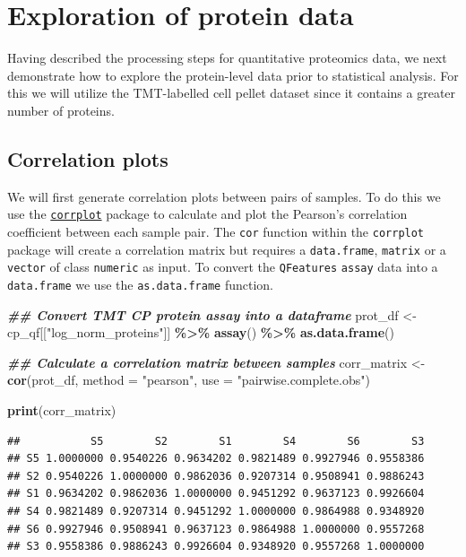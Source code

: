 \documentclass[9pt,a4paper,]{extarticle}
\newenvironment{Shaded}{\begin{snugshade}}{\end{snugshade}}
\newcommand{\AttributeTok}[1]{\textcolor[rgb]{0.13,0.29,0.53}{#1}}
\newcommand{\DocumentationTok}[1]{\textcolor[rgb]{0.56,0.35,0.01}{\textbf{\textit{#1}}}}
\newcommand{\FunctionTok}[1]{\textcolor[rgb]{0.13,0.29,0.53}{\textbf{#1}}}
\newcommand{\NormalTok}[1]{#1}
\newcommand{\OtherTok}[1]{\textcolor[rgb]{0.56,0.35,0.01}{#1}}
\newcommand{\SpecialCharTok}[1]{\textcolor[rgb]{0.81,0.36,0.00}{\textbf{#1}}}
\newcommand{\StringTok}[1]{\textcolor[rgb]{0.31,0.60,0.02}{#1}}
\begin{document}
\section{Exploration of protein data}\label{exploration-of-protein-data}

Having described the processing steps for quantitative proteomics data, we next
demonstrate how to explore the protein-level data prior to statistical analysis.
For this we will utilize the TMT-labelled cell pellet dataset since it contains
a greater number of proteins.

\subsection{Correlation plots}\label{correlation-plots}

We will first generate correlation plots between pairs of samples. To do this we
use the \href{https://cran.r-project.org/web/packages/corrplot/vignettes/corrplot-intro.html}{\texttt{corrplot}}
package to calculate and plot the Pearson's correlation coefficient between each
sample pair. The \texttt{cor} function within the \texttt{corrplot} package will create a
correlation matrix but requires a \texttt{data.frame}, \texttt{matrix} or a \texttt{vector} of class
\texttt{numeric} as input. To convert the \texttt{QFeatures} \texttt{assay} data into a \texttt{data.frame}
we use the \texttt{as.data.frame} function.

\begin{Shaded}
\begin{Highlighting}[]
\DocumentationTok{\#\# Convert TMT CP protein assay into a dataframe}
\NormalTok{prot\_df }\OtherTok{\textless{}{-}}\NormalTok{ cp\_qf[[}\StringTok{"log\_norm\_proteins"}\NormalTok{]] }\SpecialCharTok{\%\textgreater{}\%}
  \FunctionTok{assay}\NormalTok{() }\SpecialCharTok{\%\textgreater{}\%}
  \FunctionTok{as.data.frame}\NormalTok{()}

\DocumentationTok{\#\# Calculate a correlation matrix between samples}
\NormalTok{corr\_matrix }\OtherTok{\textless{}{-}} \FunctionTok{cor}\NormalTok{(prot\_df,}
                   \AttributeTok{method =} \StringTok{"pearson"}\NormalTok{,}
                   \AttributeTok{use =} \StringTok{"pairwise.complete.obs"}\NormalTok{)}

\FunctionTok{print}\NormalTok{(corr\_matrix)}
\end{Highlighting}
\end{Shaded}

\begin{verbatim}
##           S5        S2        S1        S4        S6        S3
## S5 1.0000000 0.9540226 0.9634202 0.9821489 0.9927946 0.9558386
## S2 0.9540226 1.0000000 0.9862036 0.9207314 0.9508941 0.9886243
## S1 0.9634202 0.9862036 1.0000000 0.9451292 0.9637123 0.9926604
## S4 0.9821489 0.9207314 0.9451292 1.0000000 0.9864988 0.9348920
## S6 0.9927946 0.9508941 0.9637123 0.9864988 1.0000000 0.9557268
## S3 0.9558386 0.9886243 0.9926604 0.9348920 0.9557268 1.0000000
\end{verbatim}
\end{document}
